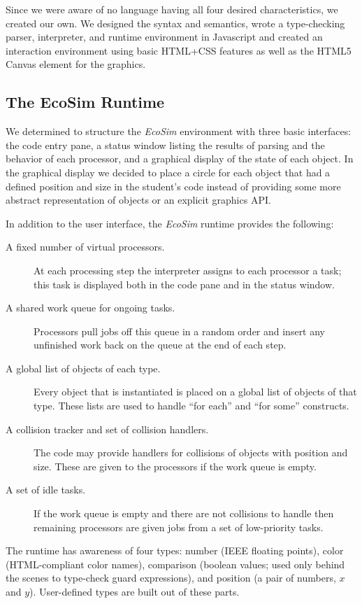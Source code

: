 \documentclass{sig-alternate}
\newcommand{\EcoSim}{\emph{EcoSim}}
\begin{document}
Since we were aware of no language having all four desired characteristics, 
we created our own.
We designed the syntax and semantics, 
wrote a type-checking parser, interpreter, and runtime environment in Javascript
and created an interaction environment using basic HTML+CSS features 
as well as the HTML5 Canvas element for the graphics.

\subsection{The EcoSim Runtime}\label{sec:runtime}
We determined to structure the \EcoSim{} environment with three basic interfaces:
the code entry pane, 
a status window listing the results of parsing and the behavior of each processor,
and a graphical display of the state of each object.
In the graphical display we decided to place a circle for each object
that had a defined position and size in the student's code
instead of providing some more abstract representation of objects
or an explicit graphics API.

In addition to the user interface, the \EcoSim{} runtime provides the following:
\begin{description}
	\item[A fixed number of virtual processors.]
		At each processing step the interpreter assigns to each processor a task;
		this task is displayed both in the code pane and in the status window.
	\item[A shared work queue for ongoing tasks.]
		Processors pull jobs off this queue in a random order
		and insert any unfinished work back on the queue at the end of each step.
	\item[A global list of objects of each type.]
		Every object that is instantiated is placed on a global list of objects of that type.
		These lists are used to handle ``for each'' and ``for some'' constructs.
	\item[A collision tracker and set of collision handlers.]
		The code may provide handlers for collisions of objects with position and size.
		These are given to the processors if the work queue is empty.
	\item[A set of idle tasks.]
		If the work queue is empty and there are not collisions to handle
		then remaining processors are given jobs from a set of low-priority tasks.
\end{description}

The runtime has awareness of four types:
number (IEEE floating points), color (HTML-compliant color names), 
comparison (boolean values; used only behind the scenes to type-check guard expressions),
and position (a pair of numbers, $x$ and $y$).
User-defined types are built out of these parts.
\end{document}
